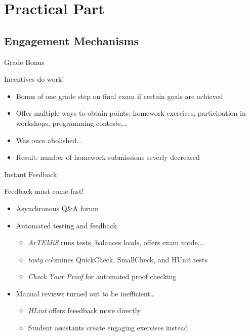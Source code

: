 \documentclass{beamer}
\begin{document}
\section{Practical Part}
\subsection{Engagement Mechanisms}
\begin{frame}{Grade Bonus}
\centerline{\Large{\alert{Incentives do work!}}}
\pause
\begin{itemize}[<+->]
\item Bonus of one grade step on final exam if certain goals are achieved
\item Offer multiple ways to obtain points: homework exercises, participation in workshops, programming contests,\dots
\item Was once abolished\dots\\
\item[] Result: number of homework submissions severly decreased
\end{itemize}
\end{frame}

\begin{frame}{Instant Feedback}
\centerline{\Large{\alert{Feedback must come fast!}}}
\pause
\begin{itemize}[<+->]
\item Asynchronous Q\&A forum
\item Automated testing and feedback
\begin{itemize}
  \item \emph{ArTEMiS} runs tests, balances loads, offers exam mode,\dots
  \item \emph{tasty} cobmines QuickCheck, SmallCheck, and HUnit tests
  \item \emph{Check Your Proof} for automated proof checking
\end{itemize}
\item Manual reviews turned out to be inefficient\dots
\begin{itemize}
  \item \emph{HLint} offers feeedback more directly
  \item Student assistants create engaging exercises instead
\end{itemize}
\end{itemize}
\end{frame}
\end{document}
